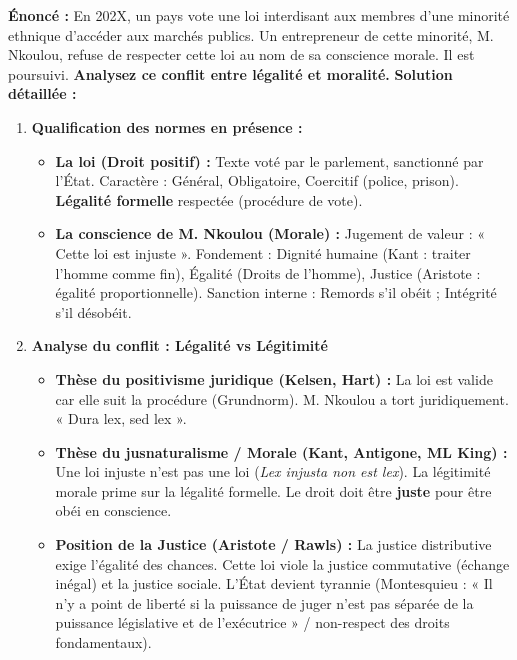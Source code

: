 \documentclass[11pt]{article}
\newcommand{\cle}[1]{{\popxbold\color{popdark}#1}}
\begin{document}
\begin{exoresolu}
\textbf{Énoncé :} En 202X, un pays vote une loi interdisant aux membres d'une minorité ethnique d'accéder aux marchés publics. Un entrepreneur de cette minorité, M. Nkoulou, refuse de respecter cette loi au nom de sa conscience morale. Il est poursuivi. \textbf{Analysez ce conflit entre légalité et moralité.}
\tcblower
\textbf{Solution détaillée :}
\begin{enumerate}
    \item \textbf{Qualification des normes en présence :}
    \begin{itemize}
        \item \textbf{La loi (Droit positif) :} Texte voté par le parlement, sanctionné par l'État. Caractère : \cle{Général}, \cle{Obligatoire}, \cle{Coercitif} (police, prison). \textbf{Légalité formelle} respectée (procédure de vote).
        \item \textbf{La conscience de M. Nkoulou (Morale) :} Jugement de valeur : « Cette loi est injuste ». Fondement : \cle{Dignité humaine} (Kant : traiter l'homme comme fin), \cle{Égalité} (Droits de l'homme), \cle{Justice} (Aristote : égalité proportionnelle). Sanction interne : \cle{Remords} s'il obéit ; \cle{Intégrité} s'il désobéit.
    \end{itemize}
    \item \textbf{Analyse du conflit : Légalité vs Légitimité}
    \begin{itemize}
        \item \textbf{Thèse du positivisme juridique (Kelsen, Hart) :} La loi est valide car elle suit la procédure (Grundnorm). M. Nkoulou a tort juridiquement. « Dura lex, sed lex ».
        \item \textbf{Thèse du jusnaturalisme / Morale (Kant, Antigone, ML King) :} Une loi injuste n'est pas une loi (\emph{Lex injusta non est lex}). La \cle{légitimité} morale prime sur la \cle{légalité} formelle. Le droit doit être \textbf{juste} pour être obéi en conscience.
        \item \textbf{Position de la Justice (Aristote / Rawls) :} La justice \cle{distributive} exige l'égalité des chances. Cette loi viole la \cle{justice commutative} (échange inégal) et la \cle{justice sociale}. L'État devient \cle{tyrannie} (Montesquieu : « Il n'y a point de liberté si la puissance de juger n'est pas séparée de la puissance législative et de l'exécutrice » / non-respect des droits fondamentaux).
    \end{itemize}

\end{enumerate}
\end{exoresolu}
\end{document}

